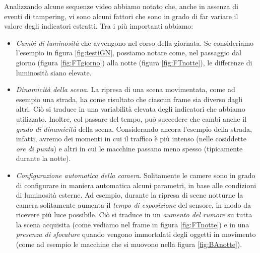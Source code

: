 Analizzando alcune sequenze video abbiamo notato che, anche in assenza di eventi di tampering, vi sono alcuni fattori che sono in grado di far variare il valore degli indicatori estratti.
Tra i pi\`u importanti abbiamo:
\begin{itemize}
	\item \textit{Cambi di luminosit\`a} che avvengono nel corso della giornata. 
	Se consideriamo l'esempio in figura \ref{fig:testiGN}, possiamo notare come, nel passaggio dal giorno (figura \ref{fig:FTgiorno}) alla notte (figura \ref{fig:FTnotte}), le differenze di luminosit\`a siano elevate.  
	\item \textit{Dinamicit\`a della scena}. La ripresa di una scena movimentata, come ad esempio una strada, ha come risultato che ciascun frame sia diverso dagli altri.
	Ci\`o si traduce in una variabilit\`a elevata degli indicatori che abbiamo utilizzato. 
	Inoltre, col passare del tempo, pu\`o succedere che cambi anche il \textit{grado di dinamicit\`a} della scena.
	Considerando ancora l'esempio della strada, infatti, avremo dei momenti in cui il traffico \`e pi\`u intenso (nelle cosiddette \textit{ore di punta}) e altri in cui le macchine passano meno spesso (tipicamente durante la notte).
	\item \textit{Configurazione automatica della camera}. Solitamente le camere sono in grado di configurare in maniera automatica alcuni parametri, in base alle condizioni di luminosit\`a esterne.
	Ad esempio, durante la ripresa di scene notturne la camera solitamente aumenta il \textit{tempo di esposizione} del sensore, in modo da ricevere pi\`u luce possibile.
	Ci\`o si traduce in un \textit{aumento del rumore} su tutta la scena acquisita (come vediamo nel frame in figura \ref{fig:FTnotte}) e in una \textit{presenza di sfocature} quando vengono immortalati degli oggetti in movimento (come ad esempio le macchine che si muovono nella figura \ref{fig:BAnotte}).
\end{itemize} 

